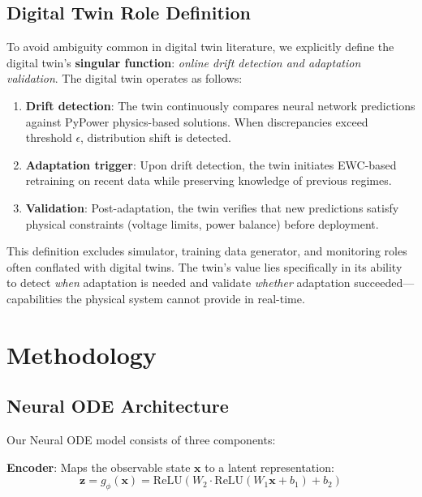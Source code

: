 \documentclass[journal,12pt,onecolumn]{IEEEtran}
\begin{document}
\subsection{Digital Twin Role Definition}

To avoid ambiguity common in digital twin literature, we explicitly define the digital twin's \textbf{singular function}: \emph{online drift detection and adaptation validation}. The digital twin operates as follows:

\begin{enumerate}
    \item \textbf{Drift detection}: The twin continuously compares neural network predictions against PyPower physics-based solutions. When discrepancies exceed threshold $\epsilon$, distribution shift is detected.
    
    \item \textbf{Adaptation trigger}: Upon drift detection, the twin initiates EWC-based retraining on recent data while preserving knowledge of previous regimes.
    
    \item \textbf{Validation}: Post-adaptation, the twin verifies that new predictions satisfy physical constraints (voltage limits, power balance) before deployment.
\end{enumerate}

This definition excludes simulator, training data generator, and monitoring roles often conflated with digital twins. The twin's value lies specifically in its ability to detect \emph{when} adaptation is needed and validate \emph{whether} adaptation succeeded—capabilities the physical system cannot provide in real-time.

\section{Methodology}
\label{sec:methodology}

\subsection{Neural ODE Architecture}

Our Neural ODE model consists of three components:

\textbf{Encoder}: Maps the observable state $\mathbf{x}$ to a latent representation:
\begin{equation}
\mathbf{z} = g_{\phi}(\mathbf{x}) = \text{ReLU}(W_2 \cdot \text{ReLU}(W_1 \mathbf{x} + b_1) + b_2)
\end{equation}
\end{document}
